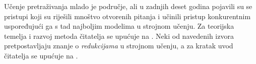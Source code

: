 Učenje pretraživanja mlado je područje, ali u zadnjih deset godina pojavili su
se pristupi koji su riješili mnoštvo otvorenih pitanja i učinili pristup
konkurentnim uspoređujući ga s tad najboljim modelima u strojnom učenju. Za
teorijska temelja i razvoj \lts{} metoda čitatelja se upućuje na
\citep{collins2004incremental, daume2005learning, daume09searn,
ross2011reduction, doppa2014hc, ross2014reinforcement, daume15lols,
andor2016globally}. Neki od navedenih izvora pretpostavljaju znanje o
\textit{redukcijama} u strojnom učenju, a za kratak uvod čitatelja se upućuje na
\citep{beygelzimer2005error, daume15reductions}.
